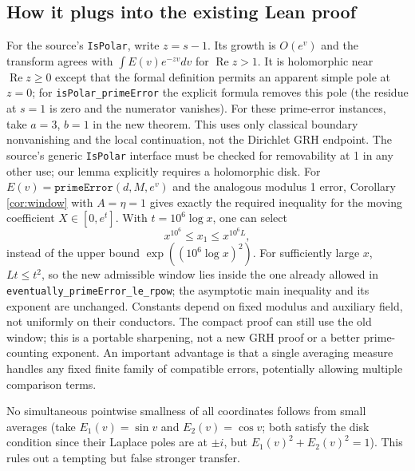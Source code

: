 \documentclass[11pt]{article}
\theoremstyle{remark}\newtheorem{remark}[theorem]{Remark}
\DeclareMathOperator{\Ree}{Re}
\begin{document}
\subsection{How it plugs into the existing Lean proof}
For the source's \texttt{IsPolar}, write $z=s-1$. Its growth is
$O(e^v)$ and the transform agrees with $\int E(v)e^{-zv}dv$ for
$\Ree z>1$. It is holomorphic near $\Ree z\ge0$ except that the
formal definition permits an apparent simple pole at $z=0$; for
\texttt{isPolar\_primeError} the explicit formula removes this pole
(the residue at $s=1$ is zero and the numerator vanishes). For these
prime-error instances, take $a=3$, $b=1$ in the new theorem. This uses
only classical boundary nonvanishing and the local continuation, not
the Dirichlet GRH endpoint. The source's generic \texttt{IsPolar}
interface must be checked for removability at 1 in any other use;
our lemma explicitly requires a holomorphic disk. For
$E(v)=\texttt{primeError}(d,M,e^v)$ and the analogous modulus 1
error, Corollary \ref{cor:window} with $A=\eta=1$ gives exactly the
required inequality for the moving coefficient $X\in[0,e^t]$.
With $t=10^6\log x$, one can select
\[
 x^{10^6}\le x_1\le x^{10^6 L},
\]
instead of the upper bound $\exp((10^6\log x)^2)$. For sufficiently
large $x$, $Lt\le t^2$, so the new admissible window lies inside the
one already allowed in \texttt{eventually\_primeError\_le\_rpow};
the asymptotic main inequality and its exponent are unchanged.
Constants depend on fixed modulus and auxiliary field, not uniformly
on their conductors. The compact proof can still use the old window;
this is a portable sharpening, not a new GRH proof or a better
prime-counting exponent. An important advantage is that a single
averaging measure handles any fixed finite family of compatible
errors, potentially allowing multiple comparison terms.

No simultaneous pointwise smallness of all coordinates follows from
small averages (take $E_1(v)=\sin v$ and $E_2(v)=\cos v$; both satisfy
the disk condition since their Laplace poles are at $\pm i$, but
$E_1(v)^2+E_2(v)^2=1$). This rules out a tempting but false stronger
transfer.
\end{document}
